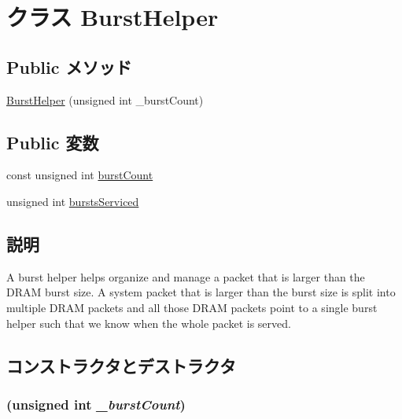 \hypertarget{classDRAMCtrl_1_1BurstHelper}{
\section{クラス BurstHelper}
\label{classDRAMCtrl_1_1BurstHelper}
}
\subsection*{Public メソッド}
\begin{DoxyCompactItemize}
\item 
\hyperlink{classDRAMCtrl_1_1BurstHelper_acb98ae00af4221d6b613fcef7a1a04b0}{BurstHelper} (unsigned int \_\-burstCount)
\end{DoxyCompactItemize}
\subsection*{Public 変数}
\begin{DoxyCompactItemize}
\item 
const unsigned int \hyperlink{classDRAMCtrl_1_1BurstHelper_af18956b23801b2515632faae1975c9d4}{burstCount}
\item 
unsigned int \hyperlink{classDRAMCtrl_1_1BurstHelper_ad168c5fe8d0f76ba798feb77107a06a1}{burstsServiced}
\end{DoxyCompactItemize}


\subsection{説明}
A burst helper helps organize and manage a packet that is larger than the DRAM burst size. A system packet that is larger than the burst size is split into multiple DRAM packets and all those DRAM packets point to a single burst helper such that we know when the whole packet is served. 

\subsection{コンストラクタとデストラクタ}
\hypertarget{classDRAMCtrl_1_1BurstHelper_acb98ae00af4221d6b613fcef7a1a04b0}{
\subsubsection[{BurstHelper}]{ (unsigned int {\em \_\-burstCount})}}
\label{classDRAMCtrl_1_1BurstHelper_acb98ae00af4221d6b613fcef7a1a04b0}



